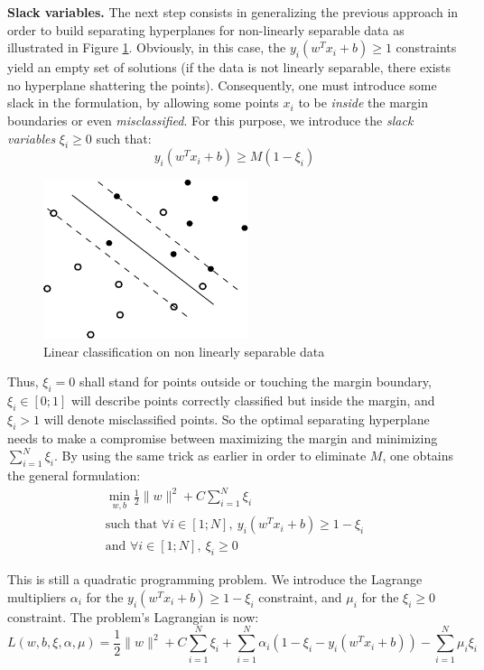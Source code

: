 \documentclass{article}
\begin{document}
\textbf{Slack variables.} The next step consists in generalizing the previous approach in order to build separating hyperplanes for non-linearly separable data as illustrated in Figure \ref{fig:nlin-lin}. Obviously, in this case, the $y_i\left( w^Tx_i + b \right) \geq 1$ constraints yield an empty set of solutions (if the data is not linearly separable, there exists no hyperplane shattering the points). Consequently, one must introduce some slack in the formulation, by allowing some points $x_i$ to be \emph{inside} the margin boundaries or even \emph{misclassified}. For this purpose, we introduce the \emph{slack variables} $\xi_i \geq 0$ such that:
\begin{equation*}
y_i\left( w^Tx_i + b \right) \geq M(1-\xi_i)
\end{equation*}
\begin{figure}
\begin{center}
\includegraphics[width=6cm]{../img/non_lin_sep1.pdf}
\end{center}
\caption{Linear classification on non linearly separable data}
\label{fig:nlin-lin}
\end{figure}
Thus, $\xi_i=0$ shall stand for points outside or touching the margin boundary, $\xi_i \in[0;1]$ will describe points correctly classified but inside the margin, and $\xi_i>1$ will denote misclassified points. So the optimal separating hyperplane needs to make a compromise between maximizing the margin and minimizing $\sum_{i=1}^N \xi_i$. By using the same trick as earlier in order to eliminate $M$, one obtains the general formulation: 
\begin{gather*}
\min_{w,b} \frac{1}{2} \|w\|^2 + C \sum_{i=1}^N \xi_i\\
\text{such that } \forall i \in [1;N], \ y_i\left( w^Tx_i + b \right) \geq 1-\xi_i\\
\text{and } \forall i \in [1;N], \ \xi_i \geq 0
\end{gather*}

This is still a quadratic programming problem. We introduce the Lagrange multipliers $\alpha_i$ for the $y_i\left( w^Tx_i + b \right) \geq 1-\xi_i$ constraint, and $\mu_i$ for the $\xi_i\geq 0$ constraint. The problem's Lagrangian is now:
\begin{equation*}
L(w,b,\xi,\alpha, \mu) = \frac{1}{2} \|w\|^2 + C \sum_{i=1}^N \xi_i + \sum_{i=1}^N \alpha_i\left(1-\xi_i-y_i\left( w^Tx_i + b \right)\right) - \sum_{i=1}^N \mu_i \xi_i
\end{equation*}
\end{document}
